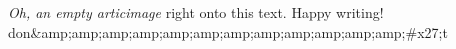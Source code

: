 \textit{Oh, an empty articimage} right onto this text. Happy writing! 
don&amp;amp;amp;amp;amp;amp;amp;amp;amp;amp;amp;amp;#x27;t
